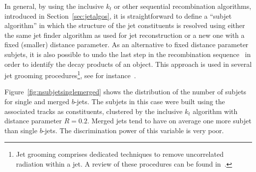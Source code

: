 In general, by using the inclusive $k_t$ or  other sequential recombination algorithms, introduced in Section~\ref{sec:jetalgos}, it is straightforward to define a ``subjet algorithm'' in which the structure of the jet constituents is resolved using either the same jet finder algorithm as used for jet reconstruction or a new one with a fixed (smaller) distance parameter. 
As an alternative to fixed distance parameter subjets, it is also possible to undo the last step in the recombination sequence~\cite{kt2} in order to identify the decay products of an object.  This approach is used in several jet grooming procedures\footnote{Jet grooming comprises dedicated techniques to remove uncorrelated radiation within a jet. A review of these procedures can be found in~\cite{Abdesselam:2010pt}. }, see for instance~\cite{pruning}.


Figure~\ref{fig:nsubjetsinglemerged} shows the distribution of the number of subjets for single and merged $b$-jets. The subjets in this case were built using the associated tracks as constituents, clustered by the inclusive $k_t$ algorithm with distance parameter $R=0.2$.  Merged jets tend to have on average one more subjet than single $b$-jets. The discrimination power of this variable is %
 very poor. 

